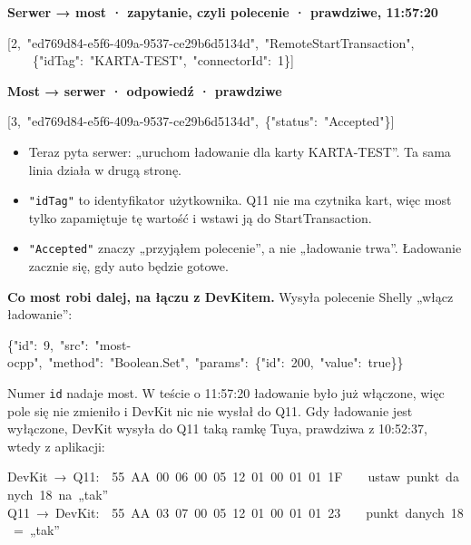 \documentclass[11pt,a4paper]{article}
\begin{document}
\textbf{Serwer {\symbolfont→} most · zapytanie, czyli polecenie ·  prawdziwe, 11:57:20}


\begin{kodbox}
\mbox{}[2,\ "ed769d84-e5f6-409a-9537-ce29b6d5134d",\ "RemoteStartTransaction",\\
\mbox{}\ \ \ \ \{"idTag":\ "KARTA-TEST",\ "connectorId":\ 1\}]
\end{kodbox}

\textbf{Most {\symbolfont→} serwer · odpowiedź ·  prawdziwe}


\begin{kodbox}
\mbox{}[3,\ "ed769d84-e5f6-409a-9537-ce29b6d5134d",\ \{"status":\ "Accepted"\}]
\end{kodbox}

\begin{itemize}
\item Teraz pyta serwer: „uruchom ładowanie dla karty KARTA-TEST”. Ta sama linia działa w drugą stronę.
\item \texttt{"idTag"} to identyfikator użytkownika. Q11 nie ma czytnika kart, więc most tylko zapamiętuje tę wartość i wstawi ją do StartTransaction.
\item \texttt{"Accepted"} znaczy „przyjąłem polecenie”, a nie „ładowanie trwa”. Ładowanie zacznie się, gdy auto będzie gotowe.
\end{itemize}

\textbf{Co most robi dalej, na łączu z DevKitem.} Wysyła polecenie Shelly „włącz ładowanie”:


\begin{kodbox}
\mbox{}\{"id":\ 9,\ "src":\ "most-ocpp",\ "method":\ "Boolean.Set",\ "params":\ \{"id":\ 200,\ "value":\ true\}\}
\end{kodbox}

 Numer \texttt{id} nadaje most. W teście o 11:57:20 ładowanie było już włączone, więc pole się nie zmieniło i DevKit nic nie wysłał do Q11. Gdy ładowanie jest wyłączone, DevKit wysyła do Q11 taką ramkę Tuya,  prawdziwa z 10:52:37, wtedy z aplikacji:


\begin{kodbox}
\mbox{}DevKit\ {\symbolfont→}\ Q11:\ \ 55\ AA\ 00\ 06\ 00\ 05\ 12\ 01\ 00\ 01\ 01\ 1F\ \ \ \ ustaw\ punkt\ danych\ 18\ na\ „tak”\\
\mbox{}Q11\ {\symbolfont→}\ DevKit:\ \ 55\ AA\ 03\ 07\ 00\ 05\ 12\ 01\ 00\ 01\ 01\ 23\ \ \ \ punkt\ danych\ 18\ =\ „tak”
\end{kodbox}
\end{document}
